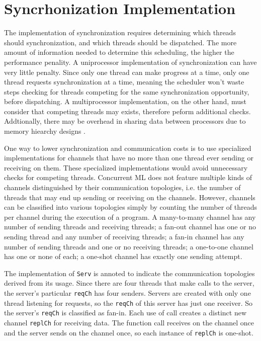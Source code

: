 \documentclass{article}
\begin{document}
\section{Syncrhonization Implementation}
The implementation of synchronization requires determining which threads should 
synchronization, and which threads should be dispatched. The more amount of information needed
to determine this scheduling, the higher the performance penality. A uniprocessor
implementation of synchronization can have very little penalty. Since only one thread can make
progress at a time, only one thread requests synchronization at a time, meaning the scheduler
won't waste steps checking for threads competing for the same synchronization opportunity,
before dispatching. A multiprocessor implementation, on the other hand, must consider that
competing threads may exists, therefore peform additional checks. Addtionally, there may be 
overhead in sharing data between processors due to memory hiearchy designs \cite{}. 

One way to lower synchronization and communication costs is to use specialized implementations
for channels that have no more than one thread ever sending or receiving on them.  These
specialized implementations would avoid unnecessary checks for competing threads.
Concurrent ML does not feature multiple kinds of channels distinguished by their communication
topologies, i.e. the number of threads that may end up sending or receiving on the channels.
However, channels can be classified into various topologies simply by counting the number of
threads per channel during the execution of a program.  A many-to-many channel has any number
of sending threads and receiving threads; a fan-out channel has one or no sending thread and
any number of receiving threads; a fan-in channel has any number of sending threads and one or
no receiving threads; a one-to-one channel has one or none of each; a one-shot channel has
exactly one sending attempt.

The implementation of \lstinline{Serv} is annoted to indicate the communication topologies
derived from its usage. Since there are four threads that make calls to the server, the
server's particular \lstinline{reqCh} has four senders.  Servers are created with only one
thread listening for requests, so the \lstinline{reqCh} of this server has just one receiver.
So the server's \lstinline{reqCh} is classified as fan-in. Each use of call creates a distinct
new channel \lstinline{replCh} for receiving data.  The function call receives on the channel
once and the server sends on the channel once, so each instance of \lstinline{replCh} is
one-shot.
\end{document}
